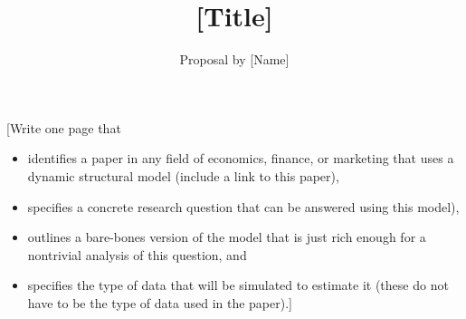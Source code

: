 \documentclass[fleqn,12pt]{article}
\title{[Title]}
\author{Proposal by [Name]}
\date{}
\begin{document}
\maketitle

[Write one page that
\begin{itemize}
\item identifies a paper in any field of economics, finance, or marketing that uses a dynamic structural model (include a link to this paper), 
\item specifies a concrete research question that can be answered using this model), 
\item outlines a bare-bones version of the model that is just rich enough for a nontrivial analysis of this question, and
\item specifies the type of data that will be simulated to estimate it (these do not have to be the type of data used in the paper).]
\end{itemize}




\end{document}
